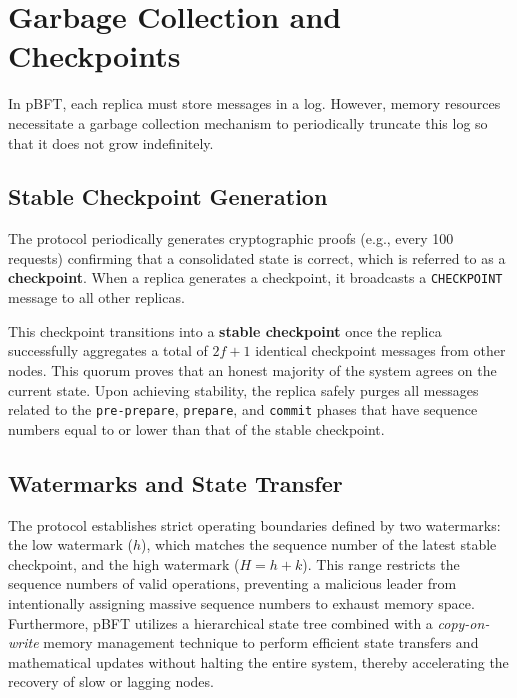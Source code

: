 \section{Garbage Collection and Checkpoints}
In pBFT, each replica must store messages in a log. However, memory resources necessitate a garbage collection mechanism to periodically truncate this log so that it does not grow indefinitely.

\subsection{Stable Checkpoint Generation}
The protocol periodically generates cryptographic proofs (e.g., every 100 requests) confirming that a consolidated state is correct, which is referred to as a \textbf{checkpoint}. When a replica generates a checkpoint, it broadcasts a \texttt{CHECKPOINT} message to all other replicas.

This checkpoint transitions into a \textbf{stable checkpoint} once the replica successfully aggregates a total of $2f+1$ identical checkpoint messages from other nodes. This quorum proves that an honest majority of the system agrees on the current state. Upon achieving stability, the replica safely purges all messages related to the \texttt{pre-prepare}, \texttt{prepare}, and \texttt{commit} phases that have sequence numbers equal to or lower than that of the stable checkpoint.

\subsection{Watermarks and State Transfer}
The protocol establishes strict operating boundaries defined by two watermarks: the low watermark ($h$), which matches the sequence number of the latest stable checkpoint, and the high watermark ($H = h + k$). This range restricts the sequence numbers of valid operations, preventing a malicious leader from intentionally assigning massive sequence numbers to exhaust memory space. Furthermore, pBFT utilizes a hierarchical state tree combined with a \textit{copy-on-write} memory management technique to perform efficient state transfers and mathematical updates without halting the entire system, thereby accelerating the recovery of slow or lagging nodes.